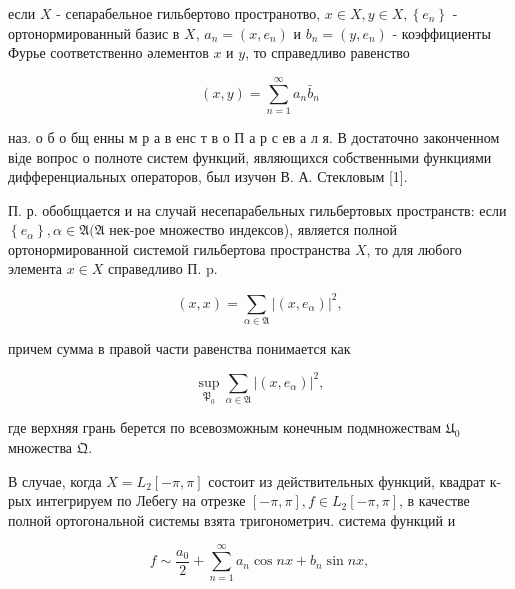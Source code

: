 \documentclass[10pt]{article}
\begin{document}
если $X$ - сепарабельное гильбертово пространотво, $x \in X, y \in X,\left\{e_{n}\right\}$ - ортонормированный базис в $X$, $a_{n}=\left(x, e_{n}\right)$ и $b_{n}=\left(y, e_{n}\right)$ - коэффициенты Фурье соответственно әлементов $x$ и $y$, то справедливо равенство



\[

(x, y)=\sum_{n=1}^{\infty} a_{n} \bar{b}_{n}

\]



наз. о б о бщ енны м р а в енс т в о П а р с ев а л я. В достаточно законченном віде вопрос о полноте систем функций, являющихся собственными функциями дифференциальных операторов, был изучөн В. А. Стекловым [1].



П. р. обобщцается и на случай несепарабельных гильбертовых пространств: если $\left\{e_{\alpha}\right\}, \alpha \in \mathfrak{A}(\mathfrak{A}$ нек-рое множество индексов), является полной ортонормированной системой гильбертова пространства $X$, то для любого элемента $x \in X$ справедливо П. $\mathrm{p}$.



\[

(x, x)=\sum_{\alpha \in \mathfrak{A}}\left|\left(x, e_{\alpha}\right)\right|^{2},

\]



причем сумма в правой части равенства понимается как



\[

\sup _{\mathfrak{P}_{0}} \sum_{\alpha \in \mathfrak{A}}\left|\left(x, e_{\alpha}\right)\right|^{2},

\]



где верхняя грань берется по всевозможным конечным подмножествам $\mathfrak{U}_{0}$ множества $\mathfrak{Q}$.



В случае, когда $X=L_{2}[-\pi, \pi]$ состоит из действительных функций, квадрат к-рых интегрируем по Лебегу на отрезке $[-\pi, \pi], f \in L_{2}[-\pi, \pi]$, в качестве полной ортогональной системы взята тригонометрич. система функций и



\[

f \sim \frac{a_{0}}{2}+\sum_{n=1}^{\infty} a_{n} \cos n x+b_{n} \sin n x,

\]
\end{document}
